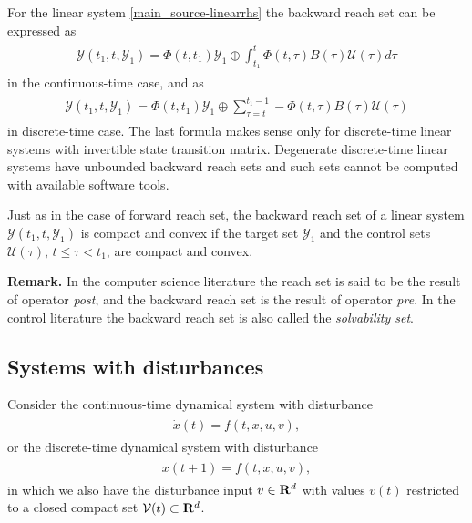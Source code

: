 \documentclass[letterpaper,10pt,english]{sphinxmanual}
\begin{document}
For the linear system \eqref{main_source-linearrhs} the backward reach set can be
expressed as
\label{main_source:equation-ctlsbrs}\begin{gather}
\begin{split}{\mathcal Y}(t_1, t, {\mathcal Y}_1) =
\Phi(t, t_1){\mathcal Y}_1 \oplus \int_{t_1}^t\Phi(t, \tau)B(\tau){\mathcal U}(\tau)d\tau\end{split}\label{main_source-ctlsbrs}
\end{gather}
in the continuous-time case, and as
\label{main_source:equation-dtlsbrs}\begin{gather}
\begin{split}{\mathcal Y}(t_1, t, {\mathcal Y}_1) =
\Phi(t, t_1){\mathcal Y}_1 \oplus \sum_{\tau =t}^{t_1-1}-\Phi(t, \tau)B(\tau){\mathcal U}(\tau)\end{split}\label{main_source-dtlsbrs}
\end{gather}
in discrete-time case. The last formula makes sense only for
discrete-time linear systems with invertible state transition matrix.
Degenerate discrete-time linear systems have unbounded backward reach
sets and such sets cannot be computed with available software tools.

Just as in the case of forward reach set, the backward reach set of a
linear system ${\mathcal Y}(t_1, t, {\mathcal Y}_1)$ is compact
and convex if the target set ${\mathcal Y}_1$ and the control sets
${\mathcal U}(\tau)$, $t\leqslant\tau<t_1$, are compact and
convex.

\textbf{Remark.} In the computer science literature the reach set is said to
be the result of operator \emph{post}, and the backward reach set is the
result of operator \emph{pre}. In the control literature the backward reach
set is also called the \emph{solvability set}.


\subsection{Systems with disturbances}
\label{main_source:systems-with-disturbances}
Consider the continuous-time dynamical system with disturbance
\label{main_source:equation-ctds2}\begin{gather}
\begin{split}\dot{x}(t) = f(t, x, u, v),\end{split}\label{main_source-ctds2}
\end{gather}
or the discrete-time dynamical system with disturbance
\label{main_source:equation-dtds2}\begin{gather}
\begin{split}x(t+1) = f(t, x, u, v),\end{split}\label{main_source-dtds2}
\end{gather}
in which we also have the disturbance input $v\in{\bf R}^d$ with
values $v(t)$ restricted to a closed compact set
${\mathcal V}(t)\subset{\bf R}^d$.
\end{document}
